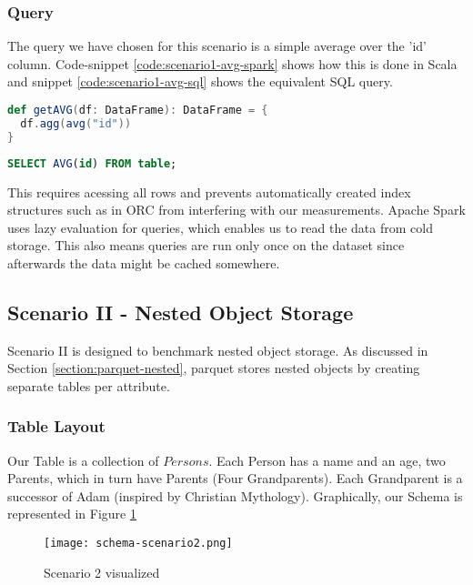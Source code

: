 \subsubsection{Query}
\label{sec:query-one}
The query we have chosen for this scenario is a simple average over the 'id' column.
Code-snippet \ref{code:scenario1-avg-spark} shows how this is done in Scala and snippet \ref{code:scenario1-avg-sql} shows the equivalent SQL query.
\begin{lstlisting}[language=Scala,caption=Average over the ID Column in Spark, label=code:scenario1-avg-spark, captionpos=b]
def getAVG(df: DataFrame): DataFrame = {
  df.agg(avg("id"))
}
\end{lstlisting}
\begin{lstlisting}[language=SQL,caption=Equivalent SQL Query, label=code:scenario1-avg-sql, captionpos=b]
  SELECT AVG(id) FROM table;
\end{lstlisting}
This requires acessing all rows and prevents automatically created index structures such as in ORC from interfering with our measurements.
Apache Spark uses lazy evaluation for queries, which enables us to read the data from cold storage.
This also means queries are run only once on the dataset since afterwards the data might be cached somewhere.

\subsection{Scenario II - Nested Object Storage}
Scenario II is designed to benchmark nested object storage.
As discussed in Section \ref{section:parquet-nested}, parquet stores nested objects by creating separate tables per attribute.

\subsubsection{Table Layout}

Our Table is a collection of $Persons$. Each Person has a name and an age, two Parents, which in turn have Parents (Four Grandparents).
Each Grandparent is a successor of Adam (inspired by Christian Mythology). Graphically, our Schema is represented in Figure \ref{fig:schema-scenario2}

\begin{figure}[h]
\centering
\texttt{[image: schema-scenario2.png]}
\caption{Scenario 2 visualized}
\label{fig:schema-scenario2}
\end{figure}

